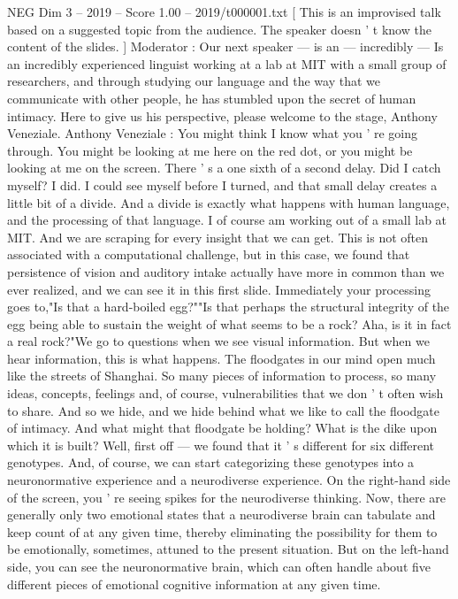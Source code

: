 \begin{textsample}{NEG Dim 3 – 2019 – Score 1.00 – 2019/t000001.txt}  \label{ex:f3_neg_078}
[ This is an improvised talk based on a suggested topic from the audience.
The speaker doesn ' t know the content of the slides. ] Moderator : Our next speaker — is an — incredibly — Is an incredibly experienced linguist working at a lab at MIT with a small group of researchers, and through studying our language and the way that we communicate with other people, he has stumbled upon the secret of human intimacy.
Here to give us his perspective, please welcome to the stage, Anthony Veneziale.
Anthony Veneziale : You might think I know what you ' re going through.
You might be looking at me here on the red dot, or you might be looking at me on the screen.
There ' s a one sixth of a second delay.
Did I catch myself?
I did.
I could see myself before I turned, and that small delay creates a little bit of a divide.
And a divide is exactly what happens with human language, and the processing of that language.
I of course am working out of a small lab at MIT.
And we are scraping for every insight that we can get.
This is not often associated with a computational challenge, but in this case, we found that persistence of vision and auditory intake actually have more in common than we ever realized, and we can see it in this first slide.
Immediately your processing goes to,"Is that a hard-boiled egg?""Is that perhaps the structural integrity of the egg being able to sustain the weight of what seems to be a rock?
Aha, is it in fact a real rock?"We go to questions when we see visual information.
But when we hear information, this is what happens.
The floodgates in our mind open much like the streets of Shanghai.
So many pieces of information to process, so many ideas, concepts, feelings and, of course, vulnerabilities that we don ' t often wish to share.
And so we hide, and we hide behind what we like to call the floodgate of intimacy.
And what might that floodgate be holding?
What is the dike upon which it is built?
Well, first off — we found that it ' s different for six different genotypes.
And, of course, we can start categorizing these genotypes into a neuronormative experience and a neurodiverse experience.
On the right-hand side of the screen, you ' re seeing spikes for the neurodiverse thinking.
Now, there are generally only two emotional states that a neurodiverse brain can tabulate and keep count of at any given time, thereby eliminating the possibility for them to be emotionally, sometimes, attuned to the present situation.
But on the left-hand side, you can see the neuronormative brain, which can often handle about five different pieces of emotional cognitive information at any given time.

\end{textsample}
